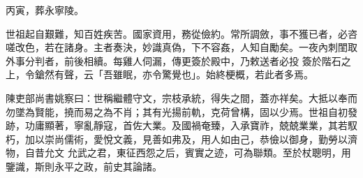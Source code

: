 \begin{pinyinscope}
 丙寅，葬永寧陵。



 世祖起自艱難，知百姓疾苦。國家資用，務從儉約。常所調斂，事不獲已者，必咨嗟改色，若在諸身。主者奏決，妙識真偽，下不容姦，人知自勵矣。一夜內刺閨取外事分判者，前後相續。每雞人伺漏，傳更簽於殿中，乃敕送者必投
 簽於階石之上，令鎗然有聲，云「吾雖眠，亦令驚覺也」。始終梗概，若此者多焉。



 陳吏部尚書姚察曰：世稱繼體守文，宗枝承統，得失之間，蓋亦祥矣。大抵以奉而勿墜為賢能，撓而易之為不肖；其有光揚前軌，克荷曾構，固以少焉。世祖自初發跡，功庸顯著，寧亂靜寇，首佐大業。及國禍奄臻，入承寶祚，兢兢業業，其若馭朽，加以崇尚儒術，愛悅文義，見善如弗及，用人如由己，恭儉以御身，勤勞以濟物，自昔允文
 允武之君，東征西怨之后，賓實之迹，可為聯類。至於杖聰明，用鑒識，斯則永平之政，前史其論諸。



\end{pinyinscope}